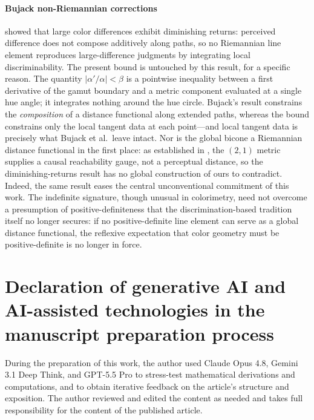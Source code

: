 \documentclass[preprint,12pt,authoryear]{elsarticle}
\theoremstyle{plain}
\theoremstyle{definition}
\theoremstyle{remark}
\begin{document}
\paragraph{Bujack non-Riemannian corrections}
\citet{Bujack2022} showed that large color differences exhibit diminishing returns: perceived difference does not compose additively along paths, so no Riemannian line element reproduces large-difference judgments by integrating local discriminability. The present bound is untouched by this result, for a specific reason. The quantity $|\alpha'/\alpha|<\beta$ is a pointwise inequality between a first derivative of the gamut boundary and a metric component evaluated at a single hue angle; it integrates nothing around the hue circle. Bujack's result constrains the \emph{composition} of a distance functional along extended paths, whereas the bound constrains only the local tangent data at each point---and local tangent data is precisely what Bujack et al.\ leave intact. Nor is the global bicone a Riemannian distance functional in the first place: as established in , the $(2,1)$ metric supplies a causal reachability gauge, not a perceptual distance, so the diminishing-returns result has no global construction of ours to contradict. Indeed, the same result eases the central unconventional commitment of this work. The indefinite signature, though unusual in colorimetry, need not overcome a presumption of positive-definiteness that the discrimination-based tradition itself no longer secures: if no positive-definite line element can serve as a global distance functional, the reflexive expectation that color geometry must be positive-definite is no longer in force.

\section*{Declaration of generative AI and AI-assisted technologies in the manuscript preparation process}

\noindent During the preparation of this work, the author used Claude Opus 4.8, Gemini 3.1 Deep Think, and GPT-5.5 Pro to stress-test mathematical derivations and computations, and to obtain iterative feedback on the article's structure and exposition. The author reviewed and edited the content as needed and takes full responsibility for the content of the published article.
\end{document}
